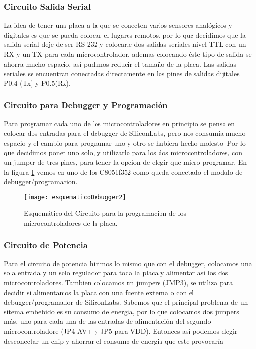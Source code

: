 
\subsubsection{Circuito Salida Serial}
\label{subsub:salida_serial2}

La idea de tener una placa a la que se conecten varios sensores analógicos y digitales es que se pueda colocar el lugares remotos, por lo que decidimos que la salida serial deje de ser RS-232 y colocarle dos salidas seriales nivel TTL con un RX y un TX para cada microcontrolador, ademas colocando éste tipo de salida se ahorra mucho espacio, así pudimos reducir el tamaño de la placa. Las salidas seriales se encuentran conectadas directamente en los pines de salidas dijitales P0.4 (Tx) y P0.5(Rx).


\subsubsection{Circuito para Debugger y Programación} %
\label{subsub:debugger_programacion2}

Para programar cada uno de los microcontroladores en principio se penso en colocar dos entradas para el debugger de SiliconLabs, pero nos consumia mucho espacio y el cambio para programar uno y otro se hubiera hecho molesto. Por lo que decidimos poner uno solo, y utilizarlo para los dos microcontroladores, con un jumper de tres pines, para tener la opcion de elegir que micro programar.
En la figura \ref{fig:esquematicoDebugger2} vemos en uno de los C8051f352 como queda conectado el modulo de debugger/programacion.

\begin{figure}  [H]
\centering
  \texttt{[image: esquematicoDebugger2]}
  \caption{Esquemático del Circuito para la programacion de los microcontroladores de la placa.}\label{fig:esquematicoDebugger2}
\end{figure}



\subsubsection{Circuito de Potencia}
\label{subsub: circuito_potencia2}

Para el circuito de potencia hicimos lo mismo que con el debugger, colocamos una sola entrada y un solo regulador para toda la placa y alimentar asi los dos microcontroladores. Tambien colocamos un jumpers (JMP3), se utiliza para decidir si alimentamos la placa con una fuente externa o con el debugger/programador de SiliconLabs. 
Sabemos que el principal problema de un sitema embebido es su consumo de energia, por lo que colocamos dos jumpers más, uno para cada una de las entradas de alimentación del segundo microcontroladore (JP4 AV+ y JP5 para VDD). Entonces así podemos elegir desconectar un chip y ahorrar el consumo de energia que este provocaría. 

